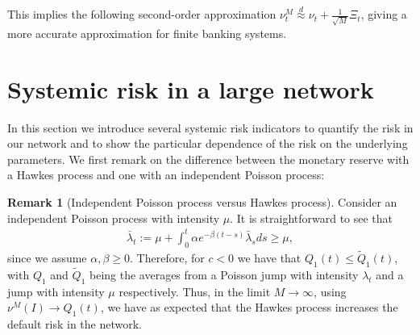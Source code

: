 \documentclass[10pt]{article}
\theoremstyle{plain}
\theoremstyle{definition}
\newtheorem{remark}[theorem]{Remark}
\newcommand{\<}{\langle}
\renewcommand{\>}{\rangle}
\renewcommand{\(}{\left(}
\renewcommand{\)}{\right)}
\renewcommand{\[}{\left[}
\renewcommand{\]}{\right]}
\begin{document}
This implies the following second-order approximation $\nu_t^M\overset{d}\approx \nu_t + \frac{1}{\sqrt{M}}\Xi_t$, giving a more accurate approximation for finite banking systems.  %

\section{Systemic risk in a large network}\label{sec5}
In this section we introduce several systemic risk indicators to quantify the risk in our network and to show the particular dependence of the risk on the underlying parameters. We first remark on the difference between the monetary reserve with a Hawkes process and one with an independent Poisson process:
\begin{remark}[Independent Poisson process versus Hawkes process] Consider an independent Poisson process with intensity $\mu$. It is straightforward to see that
\begin{align}
\bar \lambda_t :=\mu + \int_0^t\alpha e^{-\beta(t-s)}\bar\lambda_sds\geq \mu,
\end{align}
since we assume $\alpha, \beta\geq 0$.
 Therefore, for $c<0$ we have that $Q_1(t)\leq \tilde Q_1(t)$, with $Q_1$ and $\tilde Q_1$ being the averages from a Poisson jump with intensity $\lambda_t$ and a jump with intensity $\mu$ respectively. Thus, in the limit $M\rightarrow \infty$, using $\nu^M(I)\rightarrow Q_1(t)$, we have as expected that the Hawkes process increases the default risk in the network.
\end{remark}
\end{document}
